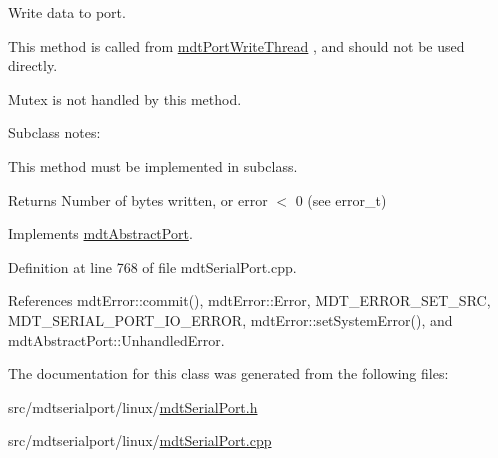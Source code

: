 Write data to port. 

This method is called from \hyperlink{classmdt_port_write_thread}{mdt\-Port\-Write\-Thread} , and should not be used directly.

Mutex is not handled by this method.

Subclass notes\-:\par
 This method must be implemented in subclass.\par


\begin{DoxyReturn}{Returns}
Number of bytes written, or error $<$ 0 (see error\-\_\-t) 
\end{DoxyReturn}


Implements \hyperlink{classmdt_abstract_port_a64d4802975a76474b9196c91f57a6d90}{mdt\-Abstract\-Port}.



Definition at line 768 of file mdt\-Serial\-Port.\-cpp.



References mdt\-Error\-::commit(), mdt\-Error\-::\-Error, M\-D\-T\-\_\-\-E\-R\-R\-O\-R\-\_\-\-S\-E\-T\-\_\-\-S\-R\-C, M\-D\-T\-\_\-\-S\-E\-R\-I\-A\-L\-\_\-\-P\-O\-R\-T\-\_\-\-I\-O\-\_\-\-E\-R\-R\-O\-R, mdt\-Error\-::set\-System\-Error(), and mdt\-Abstract\-Port\-::\-Unhandled\-Error.



The documentation for this class was generated from the following files\-:\begin{DoxyCompactItemize}
\item 
src/mdtserialport/linux/\hyperlink{mdt_serial_port_8h}{mdt\-Serial\-Port.\-h}\item 
src/mdtserialport/linux/\hyperlink{mdt_serial_port_8cpp}{mdt\-Serial\-Port.\-cpp}\end{DoxyCompactItemize}
